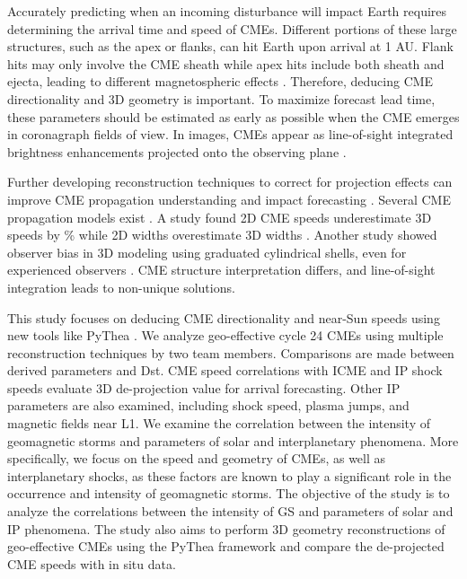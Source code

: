 Accurately predicting when an incoming disturbance will impact Earth requires determining the arrival time and speed of CMEs. Different portions of these large structures, such as the apex or flanks, can hit Earth upon arrival at 1 AU. Flank hits may only involve the CME sheath while apex hits include both sheath and ejecta, leading to different magnetospheric effects \citep{kay_2018}. Therefore, deducing CME directionality and 3D geometry is important. To maximize forecast lead time, these parameters should be estimated as early as possible when the CME emerges in coronagraph fields of view. In images, CMEs appear as line-of-sight integrated brightness enhancements projected onto the observing plane \citep{vourlidas_2003, jackson_2010}.

Further developing reconstruction techniques to correct for projection effects can improve CME propagation understanding and impact forecasting \citep{thernisien_2009, mierla_2010, wood_2010, thernisien_2011}. Several CME propagation models exist \citep{odstrcil_2004, xie_2004, vrvsnak_2013, pomoell_2018}. A study found 2D CME speeds underestimate 3D speeds by \% while 2D widths overestimate 3D widths \citep{jang_2016}. Another study showed observer bias in 3D modeling using graduated cylindrical shells, even for experienced observers \citep{verbeke_2022}. CME structure interpretation differs, and line-of-sight integration leads to non-unique solutions.

This study focuses on deducing CME directionality and near-Sun speeds using new tools like PyThea \citep{kouloumvakos_2022}. We analyze geo-effective cycle 24 CMEs using multiple reconstruction techniques by two team members. Comparisons are made between derived parameters and Dst. CME speed correlations with ICME and IP shock speeds evaluate 3D de-projection value for arrival forecasting. Other IP parameters are also examined, including shock speed, plasma jumps, and magnetic fields near L1. We examine the correlation between the intensity of geomagnetic storms and parameters of solar and interplanetary phenomena. More specifically, we focus on the speed and geometry of CMEs, as well as interplanetary shocks, as these factors are known to play a significant role in the occurrence and intensity of geomagnetic storms. The objective of the study is to analyze the correlations between the intensity of GS and parameters of solar and IP phenomena. The study also aims to perform 3D geometry reconstructions of geo-effective CMEs using the PyThea framework and compare the de-projected CME speeds with in situ data.

